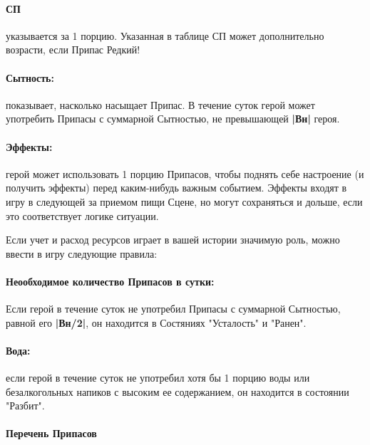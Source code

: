 \paragraph{СП} указывается за 1 порцию. Указанная в таблице СП может дополнительно возрасти, если Припас Редкий!
\paragraph{Сытность:} показывает, насколько насыщает Припас. В течение суток герой может употребить Припасы с суммарной Сытностью, не превышающей \textbf{|Вн|} героя.
\paragraph{Эффекты:} герой может использовать 1 порцию Припасов, чтобы поднять себе настроение (и получить эффекты) перед каким-нибудь важным событием. Эффекты входят в игру в следующей за приемом пищи Сцене, но могут сохраняться и дольше, если это соответствует логике ситуации.
\begin{tcolorbox}
    Если учет и расход ресурсов играет в вашей истории значимую роль, можно ввести в игру следующие правила:
    \paragraph{Неообходимое количество Припасов в сутки:} Если герой в течение суток не употребил Припасы с суммарной Сытностью, равной его \textbf{|Вн/2|}, он находится в Состяниях "Усталость" и "Ранен".
    \paragraph{Вода:} если герой в течение суток не употребил хотя бы 1 порцию воды или безалкогольных напиков с высоким ее содержанием, он находится в состоянии "Разбит".
\end{tcolorbox}
\paragraph{Перечень Припасов}



